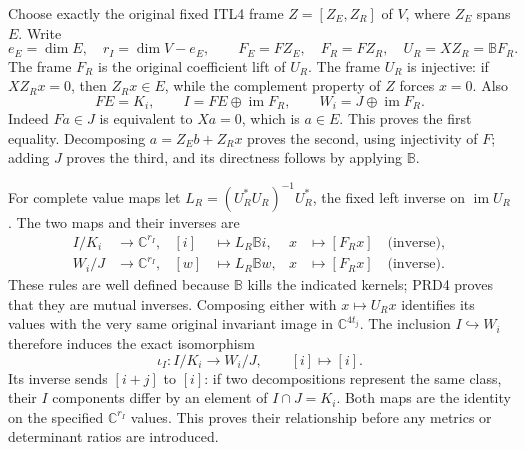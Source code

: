 Choose exactly the original fixed ITL4 frame $Z=[Z_E,Z_R]$ of $V$,
where $Z_E$ spans $E$. Write
\[
 e_E=\dim E,\quad r_I=\dim V-e_E,
 \qquad F_E=FZ_E,\quad F_R=FZ_R,\quad
 U_R=XZ_R=\mathbb BF_R.                                  \tag{PRD3}
\]
The frame $F_R$ is the original coefficient lift of $U_R$.
The frame $U_R$ is injective:
if $XZ_Rx=0$, then $Z_Rx\in E$, while the complement property
of $Z$ forces $x=0$. Also
\[
 F E=K_i,\qquad
 I=F E\mathbin{\oplus}\operatorname{im}F_R,
 \qquad W_i=J\mathbin{\oplus}\operatorname{im}F_R.       \tag{PRD4}
\]
Indeed $Fa\in J$ is equivalent to $Xa=0$, which is $a\in E$.
This proves the first equality. Decomposing $a=Z_Eb+Z_Rx$
proves the second, using injectivity of $F$; adding $J$ proves
the third, and its directness follows by applying $\mathbb B$.

For complete value maps let $L_R=(U_R^*U_R)^{-1}U_R^*$,
the fixed left inverse on $\operatorname{im}U_R$. The two maps
and their inverses are
\[
\begin{aligned}
 I/K_i&\longrightarrow\mathbb C^{r_I},&
 [i]&\longmapsto L_R\mathbb Bi,&
 x&\longmapsto[F_Rx]\quad\text{(inverse)},\\
 W_i/J&\longrightarrow\mathbb C^{r_I},&
 [w]&\longmapsto L_R\mathbb Bw,&
 x&\longmapsto[F_Rx]\quad\text{(inverse)}.
\end{aligned}                                                     \tag{PRD5}
\]
These rules are well defined because $\mathbb B$
kills the indicated kernels; PRD4 proves that they are mutual
inverses. Composing either with $x\mapsto U_Rx$ identifies its
values with the very same original invariant image in
$\mathbb C^{4t_j}$. The inclusion $I\hookrightarrow W_i$
therefore induces the exact isomorphism
\[
 \iota_I:I/K_i\longrightarrow W_i/J,\qquad [i]\longmapsto[i].
                                                               \tag{PRD6}
\]
Its inverse sends $[i+j]$ to $[i]$: if two decompositions represent
the same class, their $I$ components differ by an element of
$I\cap J=K_i$. Both maps are the identity on the specified
$\mathbb C^{r_I}$ values. This proves their relationship before
any metrics or determinant ratios are introduced.

